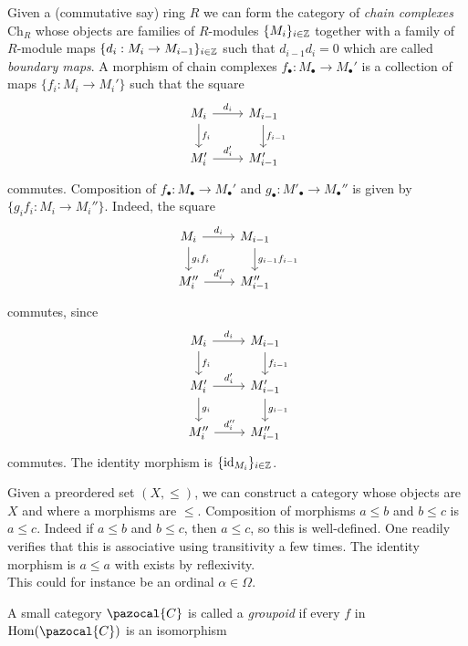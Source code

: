 \begin{example}
    Given a (commutative say) ring $R$ we can form the category of \emph{chain complexes} $\mathrm{Ch}_R$ whose objects are families of $R$-modules $\{M_i\}_{i\in\mathbb{Z}}$ together with a family of $R$-module maps $\{d_i : M_i\rightarrow M_{i-1}\}_{i\in \mathbb{Z}}$ such that $d_{i-1}d_i=0$ which are called \emph{boundary maps}. A morphism of chain complexes $f_\bullet : M_\bullet \rightarrow M_\bullet'$ is a collection of maps $\{f_i : M_i \rightarrow M_i'\}$ such that the square
    $$
        \begin{tikzcd}
            M_i \arrow[r,"d_i"]\arrow[d,"f_i"] & M_{i-1}\arrow[d,"f_{i-1}"]\\
            M_i' \arrow[r,"d_i'"] & M_{i-1}'
        \end{tikzcd}
    $$
    commutes. Composition of $f_\bullet : M_\bullet \rightarrow M_\bullet'$ and $g_\bullet : M'_\bullet \rightarrow M_\bullet''$ is given by $\{g_if_i : M_i\rightarrow M_i''\}$. Indeed, the square 
    $$
        \begin{tikzcd}
            M_i \arrow[r,"d_i"]\arrow[d,"g_if_i"] & M_{i-1}\arrow[d,"g_{i-1}f_{i-1}"]\\
            M_i'' \arrow[r,"d_i''"] & M_{i-1}''
        \end{tikzcd}
    $$ 
    commutes, since 
    $$
        \begin{tikzcd}
            M_i \arrow[r,"d_i"]\arrow[d,"f_i"] & M_{i-1}\arrow[d,"f_{i-1}"]\\
            M_i' \arrow[r,"d_i'"]\arrow[d,"g_i"] & M_{i-1}'\arrow[d,"g_{i-1}"]\\
            M_i'' \arrow[r,"d_i''"] & M_{i-1}''
        \end{tikzcd}
    $$
    commutes. The identity morphism is $\{\mathrm{id}_{M_i}\}_{i\in\mathbb{Z}}$.
\end{example} 
\begin{example}
    Given a preordered set $(X,\leq)$, we can construct a category whose objects are $X$ and where a morphisms are $\leq$. Composition of morphisms $a\leq b$ and $b\leq c$ is $a\leq c$. Indeed if $a\leq b$ and $b\leq c$, then $a\leq c$, so this is well-defined. One readily verifies that this is associative using transitivity a few times. The identity morphism is $a\leq a$ with exists by reflexivity.\\
    This could for instance be an ordinal $\alpha\in \Omega$.
\end{example}
\begin{definition}
    A small category $\pazocal{C}$ is called a \textit{groupoid} if every $f$ in $\Hom(\pazocal{C})$ is an isomorphism
\end{definition}
